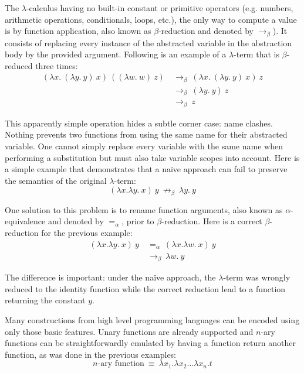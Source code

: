 The $\lambda$-calculus having no built-in constant or primitive operators (e.g. numbers, arithmetic
operations, conditionals, loops, etc.), the only way to compute a value is by function application,
also known as $\beta$-reduction and denoted by $\to_\beta$). It consists of replacing every instance
of the abstracted variable in the abstraction body by the provided argument. Following is an
example of a $\lambda$-term that is $\beta$-reduced three times:
\begin{align*}
  (\lambda x. \ (\lambda y. \ y) \ x) \ ((\lambda w. \ w) \ z)
    & \: \to_\beta \: (\lambda x. \ (\lambda y. \ y) \ x) \ z \\
    & \: \to_\beta \: (\lambda y. \ y) \ z \\
    & \: \to_\beta \: z
\end{align*}

This apparently simple operation hides a subtle corner case: name clashes. Nothing prevents two
functions from using the same name for their abstracted variable. One cannot simply replace every
variable with the same name when performing a substitution but must also take variable scopes into
account. Here is a simple example that demonstrates that a naïve approach can fail to preserve the
semantics of the original $\lambda$-term:
\begin{displaymath}
  (\lambda x. \lambda y. \ x) \ y \: \not\to_\beta \: \lambda y. \ y
\end{displaymath}

One solution to this problem is to rename function arguments, also known as $\alpha$-equivalence and
denoted by $=_\alpha$, prior to $\beta$-reduction. Here is a correct $\beta$-reduction for the
previous example:
\begin{align*}
  (\lambda x. \lambda y. \ x) \ y
    & \: =_\alpha \: (\lambda x. \lambda w. \ x) \ y \\
    & \: \to_\beta \: \lambda w. \ y
\end{align*}

The difference is important: under the naïve approach, the $\lambda$-term was wrongly reduced to the
identity function while the correct reduction lead to a function returning the constant $y$.

Many constructions from high level programming languages can be encoded using only those basic
features. Unary functions are already supported and $n$-ary functions can be straightforwardly
emulated by having a function return another function, as was done in the previous examples:
\begin{displaymath}
  n\text{-ary function} \: \equiv \: \lambda x_1. \lambda x_2 \dots \lambda x_n. t
\end{displaymath}

